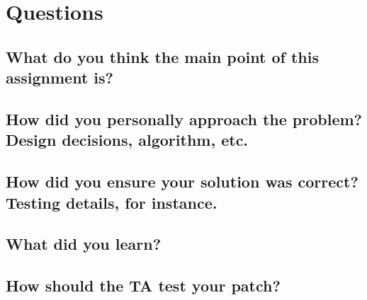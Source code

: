 \documentclass[letterpaper, onecolumn, draftclsnofoot, 10pt, compsoc]{IEEEtran}
\begin{document}
\section{Questions}
    
    \subsection{What do you think the main point of this assignment is?}
        \begin{singlespace}
         
        \end{singlespace}
    
    \subsection{How did you personally approach the problem? Design decisions, algorithm, etc.}
        \begin{singlespace}
        
        \end{singlespace}
    
    \subsection{How did you ensure your solution was correct? Testing details, for instance.}
        \begin{singlespace}
        
        \end{singlespace}
    
    \subsection{What did you learn?}
        \begin{singlespace}
        
        \end{singlespace}
        
    \subsection{How should the TA test your patch?}
        \begin{singlespace}
        
        \end{singlespace}
\end{document}
